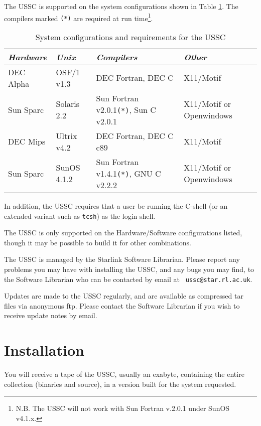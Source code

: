 The USSC is supported on the system configurations shown in Table
\ref{tab:cons}. The compilers marked {\tt (*)} are required at run
time\footnote{N.B. The USSC will not work with Sun Fortran
v.2.0.1 under SunOS v4.1.x.}.

\begin{table}[h]
\begin{small}
\begin{center}
\begin{tabular}{|l|l|l|l|} \hline
{\em Hardware} & {\em Unix} & {\em Compilers} & {\em Other} \\ \hline \hline
DEC Alpha & OSF/1 v1.3  & DEC Fortran, DEC C  & X11/Motif \\ \hline
Sun Sparc & Solaris 2.2 & Sun Fortran v2.0.1{\tt (*)}, Sun C v2.0.1 & X11/Motif 
or Openwindows \\ \hline
DEC Mips  & Ultrix v4.2 & DEC Fortran, DEC C c89 & X11/Motif \\ \hline
Sun Sparc & SunOS 4.1.2 & Sun Fortran v1.4.1{\tt (*)}, GNU C v2.2.2 & X11/Motif 
or Openwindows \\ \hline \hline
\end{tabular}
\caption{System configurations and requirements for the USSC}
\label{tab:cons}
\end{center}
\end{small}
\end{table}

In addition, the USSC requires that a user be running the C-shell (or
an extended variant such as {\tt tcsh}) as the login shell.

The USSC is only supported on the Hardware/Software configurations listed,
though it may be possible to build it for other combinations.

The USSC is managed by the Starlink Software Librarian. Please report any
problems you may have with installing the USSC, and any bugs you may
find, to the Software Librarian who can be contacted by email at {\tt
ussc@star.rl.ac.uk}.

Updates are made to the USSC regularly, and are available as compressed
tar files via anonymous ftp. Please contact the Software Librarian if 
you wish to receive update notes by email.

\newpage

\section{Installation}

You will receive a tape of the USSC, usually an exabyte, containing 
the entire collection (binaries and source), in a version built for 
the system requested.

